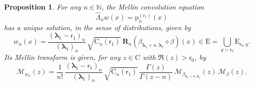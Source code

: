 \documentclass[JEP,XML,SOM,Unicode]{cedram}
\theoremstyle{plain}
\newtheorem{proposition}[theorem]{Proposition}
\theoremstyle{definition}
\newcommand{\N}{\mathbb{N}}
\newcommand{\calM}{\mathcal{M}}
\newcommand{\Rc}{\mathbf{R}}
\newcommand{\C}{{\mathrm{C}}}
\newcommand{\Em}{\mathrm{E}}
\newcommand{\pab}[1][\alpha,\beta]{\mathrm{p}^{(#1)}}
\newcommand{\lam}{{\bm{\lambda}_1}}
\newcommand{\tet}{{\mathsf{r}_0}}
\newcommand{\vat}{{\mathsf{r}_1}}
\newcommand{\gab}[1][\lam,\mo]{{\beta_{#1}}}
\let\mo\mu
\let\bpsi\beta
\begin{document}
\begin{proposition}
\label{prop:Convolution}
For any $n \in \N$, the Mellin convolution equation
\begin{equation}
\label{eq:equation_w_n1}
\widehat{\Lambda}_{\phi} w (x) = \pab[\vat]_n(x)
\end{equation}
has a unique solution, in the sense of distributions, given by
\begin{equation}
\label{eq:w_n}
w_n(x) = \frac{(\lam-\vat)_n}{(\lam)_n}\, \sqrt{\C_n(\vat)} \ \Rc_n (\gab[\lam+n,\lam] \diamond \bpsi) (x) \in \Em = \bigcup_{q>\tet}\Em_{\tet,q}.
\end{equation}
Its Mellin transform is given, for any $z \in \C$ with $\Re(z)>\tet$, by
\begin{equation}
\label{eq:Mellin_w_n}
\calM_{w_n}(z) = \frac{1}{n!}\, \frac{(\lam-\vat)_n}{(\lam)_n}\, \sqrt{\C_n(\vat)}\, \frac{\Gamma(z)}{\Gamma(z-n)}\, \calM_{\gab[\lam+n,\lam]}(z)\, \calM_\bpsi(z).
\end{equation}
\end{proposition}
\end{document}
